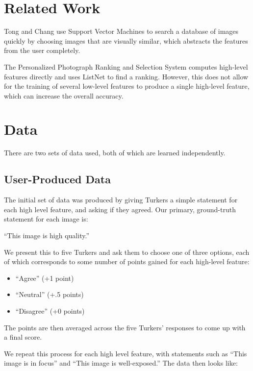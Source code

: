 \documentclass[10pt,twocolumn]{article}
\begin{document}
\section{Related Work}
Tong and Chang\cite{Tong:2001:SVM:500141.500159} use Support Vector Machines to search a database of images quickly by choosing images that are visually similar, which abstracts the features from the user completely.

The Personalized Photograph Ranking and Selection System\cite{Yeh:2010:PPR:1873951.1873963} computes high-level features directly and uses ListNet\cite{Cao:2007:LRP:1273496.1273513} to find a ranking. However, this does not allow for the training of several low-level features to produce a single high-level feature, which can increase the overall accuracy.

\section{Data}

There are two sets of data used, both of which are learned independently.

\subsection{User-Produced Data}
\label{turkdata}
The initial set of data was produced by giving Turkers a simple statement for each high level feature, and asking if they agreed. Our primary, ground-truth statement for each image is:

``This image is high quality.''

We present this to five Turkers and ask them to choose one of three options, each of which corresponds to some number of points gained for each high-level feature:

\begin{itemize}
\item ``Agree'' (+1 point)
\item ``Neutral'' (+.5 points)
\item ``Disagree'' (+0 points)
\end{itemize}
The points are then averaged across the five Turkers' responses to come up with a final score.

We repeat this process for each high level feature, with statements such as ``This image is in focus'' and ``This image is well-exposed.'' The data then looks like:

\end{document}
